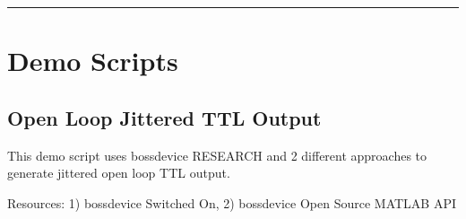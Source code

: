 \documentclass[letterpaper,10pt,english]{sphinxmanual}
\begin{document}
\bigskip\hrule\bigskip



\chapter{Demo Scripts}
\label{\detokenize{5_demo_scripts:demo-scripts}}\label{\detokenize{5_demo_scripts::doc}}

\section{Open Loop Jittered TTL Output}
\label{\detokenize{5_demo_scripts:open-loop-jittered-ttl-output}}
\sphinxAtStartPar
This demo script uses bossdevice RESEARCH and 2 different approaches to generate jittered open loop TTL output.

\sphinxAtStartPar
Resources: 1) bossdevice Switched On, 2) bossdevice Open Source MATLAB API
\end{document}
